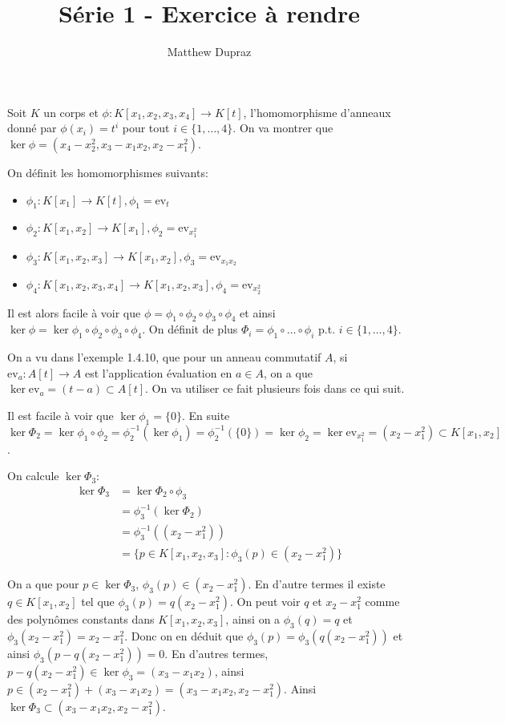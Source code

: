 \documentclass[french]{article}
\title{Série 1 - Exercice à rendre}
\author{Matthew Dupraz}
\newcommand{\ev}{\mathrm{ev}}
\begin{document}
\maketitle

Soit $K$ un corps et $\phi: K[x_1, x_2, x_3, x_4] \to K[t]$, l'homomorphisme
d'anneaux donné par $\phi (x_i) = t^i$ pour tout $i \in \{1, \dots, 4\}$.
On va montrer que $\ker \phi = (x_4 - x_2^2, x_3 - x_1x_2, x_2 - x_1^2)$.

On définit les homomorphismes suivants:
\begin{itemize}
	\item $\phi_1:K[x_1] \to K[t], \phi_1 = \ev_t$
	\item $\phi_2: K[x_1, x_2] \to K[x_1], \phi_2 = \ev_{x_1^2}$
	\item $\phi_3: K[x_1, x_2, x_3] \to K[x_1, x_2], \phi_3 = \ev_{x_1x_2}$
	\item $\phi_4: K[x_1, x_2, x_3, x_4] \to K[x_1, x_2, x_3],
		\phi_4 = \ev_{x_2^2}$
\end{itemize}

Il est alors facile à voir que $\phi = \phi_1 \circ \phi_2 \circ \phi_3 \circ
\phi_4$ et ainsi $\ker \phi = \ker \phi_1 \circ \phi_2 \circ \phi_3 \circ
\phi_4$. On définit de plus $\Phi_i = \phi_1 \circ \dots \circ \phi_i$ p.t.
$i \in \{1, \dots, 4\}$.

On a vu dans l'exemple 1.4.10, que pour un anneau commutatif
$A$, si $\ev_a: A[t] \to A$ est l'application évaluation en $a \in A$,
on a que $\ker\ev_a = (t - a) \subset A[t]$. On va utiliser ce fait plusieurs
fois dans ce qui suit.

Il est facile à voir que $\ker \phi_1 = \{0\}$.
En suite $\ker\Phi_2 = \ker\phi_1\circ\phi_2 =
\phi_2^{-1}(\ker\phi_1) = \phi_2^{-1}(\{0\})
= \ker\phi_2 = \ker\ev_{x_1^2} = (x_2 - x_1^2) \subset K[x_1, x_2]$. 

On calcule $\ker \Phi_3$:
\begin{align*}
	\ker\Phi_3 &= \ker \Phi_2\circ\phi_3\\
	&= \phi_3^{-1}(\ker\Phi_2)\\
	&= \phi_3^{-1}((x_2 - x_1^2))\\
	&= \{p \in K[x_1, x_2, x_3]: \phi_3(p) \in (x_2 - x_1^2)\}
\end{align*}

On a que pour $p \in \ker \Phi_3$,
$\phi_3(p) \in (x_2 - x_1^2)$. En d'autre termes il existe $q \in K[x_1, x_2]$
tel que $\phi_3(p) = q(x_2 - x_1^2)$. On peut voir $q$ et
$x_2 - x_1^2$ comme des polynômes constants dans $K[x_1, x_2, x_3]$, ainsi on a
$\phi_3(q) = q$ et $\phi_3(x_2 - x_1^2) = x_2 - x_1^2$.
Donc on en déduit que $\phi_3(p) = \phi_3(q(x_2- x_1^2))$ et ainsi
$\phi_3(p - q(x_2 - x_1^2)) = 0$.
En d'autres termes, $p - q(x_2 - x_1^2) \in \ker\phi_3 = (x_3 - x_1 x_2)$, 
ainsi $p \in (x_2 - x_1^2) + (x_3 - x_1x_2) = (x_3 - x_1x_2, x_2 - x_1^2)$.
Ainsi $\ker \Phi_3 \subset (x_3 - x_1x_2, x_2 - x_1^2)$.
\end{document}
